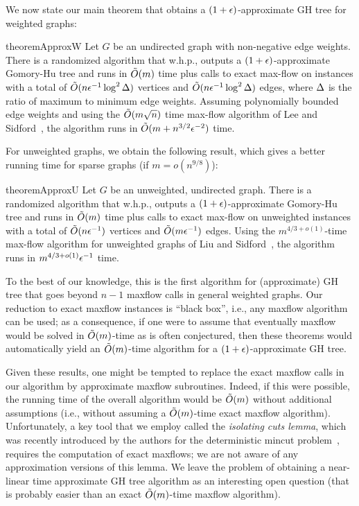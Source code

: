 We now state our main theorem that obtains a $(1+\epsilon)$-approximate GH tree for weighted graphs:
\begin{restatable}{theorem}{ApproxW}
    Let $G$ be an undirected graph with non-negative edge weights. There is a randomized algorithm that w.h.p., outputs a $(1+\epsilon)$-approximate Gomory-Hu tree and runs in $\tilde{O}(m)$ time plus calls to exact max-flow on instances with a total of $\tilde{O}(n\epsilon^{-1}\log^2\Delta)$ vertices and $\tilde{O}(n\epsilon^{-1}\log^2\Delta)$ edges, where $\Delta$ is the ratio of maximum to minimum edge weights. Assuming polynomially bounded edge weights and using the $\tilde{O}(m\sqrt{n})$ time max-flow algorithm of Lee and Sidford~\cite{LeeSflow}, the algorithm runs in $\tilde{O}(m + n^{3/2}\epsilon^{-2})$ time.
\end{restatable}
For unweighted graphs, we obtain the following result, which gives a better running time for sparse graphs (if $m = o(n^{9/8})$):
\begin{restatable}{theorem}{ApproxU}
Let $G$ be an unweighted, undirected graph. There is a randomized algorithm that w.h.p., outputs a $(1+\epsilon)$-approximate Gomory-Hu tree and runs in $\tilde{O}(m)$ time plus calls to exact max-flow on unweighted instances with a total of $\tilde{O}(n\epsilon^{-1})$ vertices and $\tilde{O}(m\epsilon^{-1})$ edges. Using the $m^{4/3+o(1)}$-time max-flow algorithm for unweighted graphs of Liu and Sidford~\cite{liu2020faster}, the algorithm runs in $m^{4/3+o(1)}\epsilon^{-1}$ time.
\end{restatable}

To the best of our knowledge, this is the first algorithm for (approximate) GH tree that goes beyond $n-1$ maxflow calls in general weighted graphs. Our reduction to exact maxflow instances is ``black box'', i.e., any maxflow algorithm can be used; as a consequence, if one were to assume that eventually maxflow would be solved in $\tilde{O}(m)$-time as is often conjectured, then these theorems would automatically yield an $\tilde{O}(m)$-time algorithm for a $(1+\epsilon)$-approximate GH tree.

Given these results, one might be tempted to replace the exact maxflow calls in our algorithm by approximate maxflow subroutines. Indeed, if this were possible, the running time of the overall algorithm would be $\tilde{O}(m)$ without additional assumptions (i.e., without assuming a $\tilde{O}(m)$-time exact maxflow algorithm). Unfortunately, a key tool that we employ called the {\em isolating cuts lemma}, which was recently introduced by the authors for the deterministic mincut problem~\cite{LiP20}, requires the computation of exact maxflows; we are not aware of any approximation versions of this lemma. We leave the problem of obtaining a near-linear time approximate GH tree algorithm as an interesting open question (that is probably easier than an exact $\tilde{O}(m)$-time maxflow algorithm).


